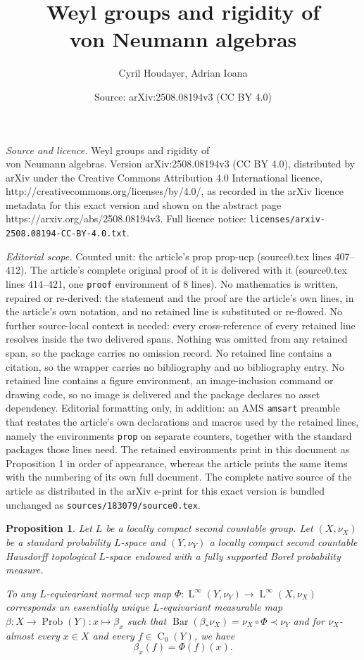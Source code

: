 \documentclass[10pt,a4paper]{amsart}
\title{Weyl groups and rigidity of \\ von Neumann algebras}
\author{Cyril Houdayer, Adrian Ioana}
\date{Source: arXiv:2508.08194v3 (CC BY 4.0)}
\newtheorem{prop}{Proposition}
\newcommand{\Prob}{\operatorname{Prob}}
\newcommand{\bary}{\operatorname{Bar}}
\newcommand{\rC}{\operatorname{C}}
\newcommand{\rL}{\operatorname{ L}}
\begin{document}
\maketitle

\noindent\emph{Source and licence.} Weyl groups and rigidity of \\ von Neumann algebras. Version arXiv:2508.08194v3 (CC BY 4.0), distributed by arXiv under the Creative Commons Attribution 4.0 International licence, http://creativecommons.org/licenses/by/4.0/, as recorded in the arXiv licence metadata for this exact version and shown on the abstract page https://arxiv.org/abs/2508.08194v3. Full licence notice: \texttt{licenses/arxiv-2508.08194-CC-BY-4.0.txt}.\par\smallskip

\noindent\textit{Editorial scope.} Counted unit: the article's prop prop-ucp (source0.tex lines 407--412). The article's complete original proof of it is delivered with it (source0.tex lines 414--421, one \texttt{proof} environment of 8 lines). No mathematics is written, repaired or re-derived: the statement and the proof are the article's own lines, in the article's own notation, and no retained line is substituted or re-flowed.  No further source-local context is needed: every cross-reference of every retained line resolves inside the two delivered spans.  Nothing was omitted from any retained span, so the package carries no omission record.  No retained line contains a citation, so the wrapper carries no bibliography and no bibliography entry.  No retained line contains a figure environment, an image-inclusion command or drawing code, so no image is delivered and the package declares no asset dependency.  Editorial formatting only, in addition: an AMS \texttt{amsart} preamble that restates the article's own declarations and macros used by the retained lines, namely the environments \texttt{prop} on separate counters, together with the standard packages those lines need.  The retained environments print in this document as Proposition 1 in order of appearance, whereas the article prints the same items with the numbering of its own full document.  The complete native source of the article as distributed in the arXiv e-print for this exact version is bundled unchanged as \texttt{sources/183079/source0.tex}.
\begin{prop}\label{prop-ucp}
Let $L$ be a locally compact second countable group. Let $(X, \nu_X)$ be a standard probability $L$-space and $(Y, \nu_Y)$ a locally compact second countable Hausdorff topological $L$-space endowed with a fully supported Borel probability measure. 

To any $L$-equivariant normal ucp map $\Phi : \rL^\infty(Y, \nu_Y) \to \rL^\infty(X, \nu_X)$ corresponds an essentially unique $L$-equivariant measurable map $\beta : X \to \Prob(Y) : x \mapsto \beta_x$ such that $\bary(\beta_\ast \nu_X) = \nu_X \circ \Phi \prec \nu_Y$ and for $\nu_X$-almost every $x \in X$ and every $f \in \rC_0(Y)$, we have 
$$\beta_x(f) = \Phi(f)(x).$$
\end{prop}
\end{document}
